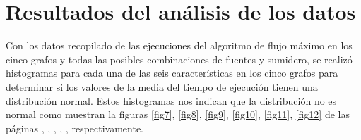 \documentclass{article}
\begin{document}
\section{Resultados del análisis de los datos}


Con los datos recopilado de las ejecuciones del algoritmo de flujo máximo en los cinco grafos y todas las posibles combinaciones de fuentes y sumidero, se realizó histogramas para cada una de las seis características en los cinco grafos para determinar si los valores de la media del tiempo de ejecución tienen una distribución normal. Estos histogramas nos indican que la distribución no es normal como muestran la figuras \ref{fig7}, \ref{fig8}, \ref{fig9}, \ref{fig10}, \ref{fig11}, \ref{fig12} de las páginas \pageref{fig7}, \pageref{fig8}, \pageref{fig9}, \pageref{fig10}, \pageref{fig11}, \pageref{fig12} respectivamente.  
\end{document}
